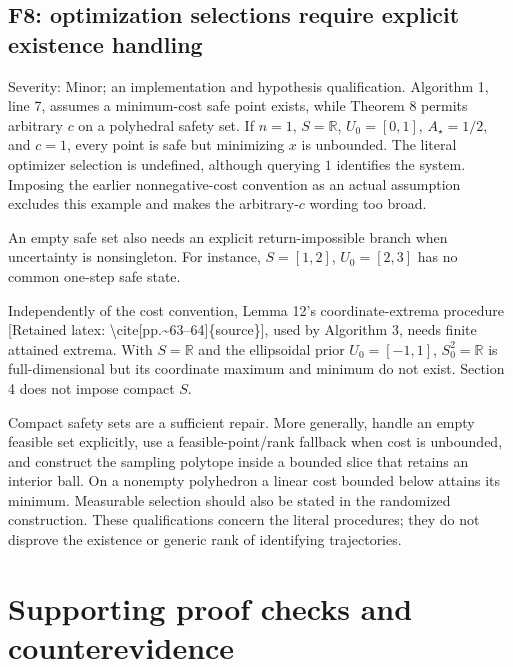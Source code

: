 \documentclass[10pt]{article}
\begin{document}
\subsection*{F8: optimization selections require explicit existence handling}
Severity: Minor; an implementation and hypothesis qualification. Algorithm 1, line 7, assumes a minimum-cost safe point exists, while Theorem 8 permits arbitrary \(c\) on a polyhedral safety set. If \(n=1\), \(S=\mathbb R\), \(U_0=[0,1]\), \(A_\star=1/2\), and \(c=1\), every point is safe but minimizing \(x\) is unbounded. The literal optimizer selection is undefined, although querying \(1\) identifies the system. Imposing the earlier nonnegative-cost convention as an actual assumption excludes this example and makes the arbitrary-\(c\) wording too broad.\par
An empty safe set also needs an explicit return-impossible branch when uncertainty is nonsingleton. For instance, \(S=[1,2]\), \(U_0=[2,3]\) has no common one-step safe state.\par
Independently of the cost convention, Lemma 12’s coordinate-extrema procedure [Retained latex: \textbackslash{}cite[pp.\textasciitilde{}63--64]\{source\}], used by Algorithm 3, needs finite attained extrema. With \(S=\mathbb R\) and the ellipsoidal prior \(U_0=[-1,1]\), \(S_0^2=\mathbb R\) is full-dimensional but its coordinate maximum and minimum do not exist. Section 4 does not impose compact \(S\).\par
Compact safety sets are a sufficient repair. More generally, handle an empty feasible set explicitly, use a feasible-point/rank fallback when cost is unbounded, and construct the sampling polytope inside a bounded slice that retains an interior ball. On a nonempty polyhedron a linear cost bounded below attains its minimum. Measurable selection should also be stated in the randomized construction. These qualifications concern the literal procedures; they do not disprove the existence or generic rank of identifying trajectories.\par
\section*{Supporting proof checks and counterevidence}
\end{document}
